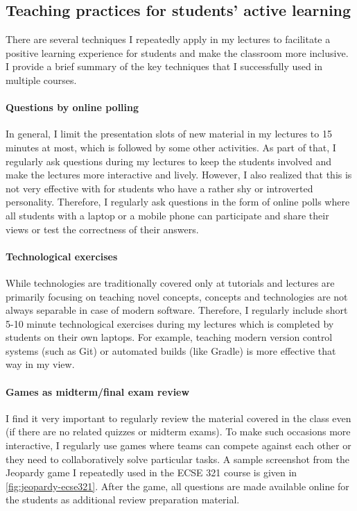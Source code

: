 \subsection{Teaching practices for students' active learning}

There are several techniques I repeatedly apply in my lectures to facilitate a positive learning experience for students and 
make the classroom more inclusive. I provide a brief summary of the key techniques that I successfully used in multiple 
courses. 


\paragraph{Questions by online polling}
In general, I limit the presentation slots of new material in my lectures to 15 minutes at most, which is followed by some 
other activities. As part of that, I regularly ask questions during my lectures to keep the students involved and make the 
lectures more interactive and lively. However, I also realized that this is not very effective with for students who have a 
rather shy or introverted personality. Therefore, I regularly ask questions in the form of online polls where all students with 
a laptop or a mobile phone can participate and share their views or test the correctness of their answers. 

\paragraph{Technological exercises}
While technologies are traditionally covered only at tutorials and lectures are primarily focusing on teaching novel concepts, concepts and technologies are not always separable in case of modern software. Therefore, I regularly include short 5-10 minute technological exercises during my lectures which is completed by students on their own laptops. For example, teaching modern version control systems (such as Git) or automated builds (like Gradle) is more effective that way in my view. 

\paragraph{Games as midterm/final exam review}
I find it very important to regularly review the material covered in the class even (if there are no related quizzes or midterm exams). To make such occasions more interactive, I regularly use games where teams can compete against each other or they need to collaboratively solve particular tasks. A sample screenshot from the Jeopardy game I repeatedly used in the ECSE 321 course is given in \autoref{fig:jeopardy-ecse321}. After the game, all questions are made available online for the students as additional review preparation material.

